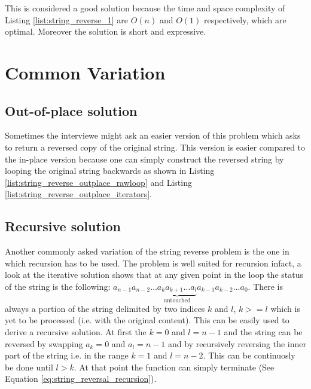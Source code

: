 This is considered a good solution because the time and space complexity of Listing \ref{list:string_reverse_1} are $O(n)$ and $O(1)$ respectively, which are optimal. Moreover the solution is short and expressive. 

\section{Common Variation}
\label{string_reverse:sec:variations}

\subsection{Out-of-place solution}
Sometimes the interviewe might ask an easier version of this problem which asks to return a reversed copy of the  original string. This version is easier compared to the in-place version because one can simply construct the reversed string by looping the original string backwards as shown in Listing \ref{list:string_reverse_outplace_rawloop} and Listing \ref{list:string_reverse_outplace_iterators}.





\subsection{Recursive solution}
Another commonly asked variation of the string reverse problem is the one in which recursion has to be used. The problem is well suited for recursion infact, a look at the iterative solution shows that at any given point in the loop the status of the string is the following: $a_{n-1}a_{n-2} \ldots \underbrace{a_k a_{k+1} \ldots a_l}_\text{untouched} a_{k-1}a_{k-2} \ldots a_0$. There is always a portion of the string delimited by two indices $k$ and $l$, $k>=l$ which is yet to be processed (i.e. with the original content). This can be easily used to derive a recursive solution. At first the $k=0$ and $l=n-1$ and the string can be reversed by swapping $a_k=0$ and $a_l=n-1$ and by recursively reversing the inner part of the string i.e. in the range $k=1$ and $l=n-2$. This can be continuosly be done until $l > k$. At that point the function can simply terminate (See Equation \ref{eq:string_reversal_recursion}).

